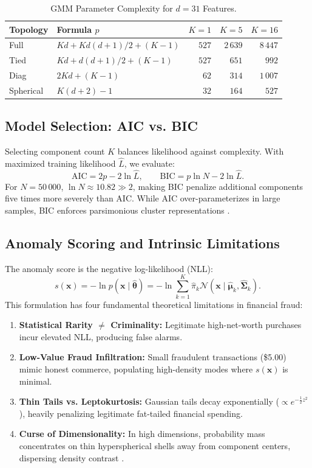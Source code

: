 \begin{table}[h]
\centering
\caption{GMM Parameter Complexity for $d=31$ Features.}
\label{tab:gmm_param_complexity}
\footnotesize
\begin{tabular}{llrrr}
\hline
\textbf{Topology} & \textbf{Formula $p$} & \textbf{$K=1$} & \textbf{$K=5$} & \textbf{$K=16$} \\
\hline
Full & $Kd + Kd(d+1)/2 + (K-1)$ & $527$ & $2\,639$ & $8\,447$ \\
Tied & $Kd + d(d+1)/2 + (K-1)$ & $527$ & $651$ & $992$ \\
Diag & $2Kd + (K-1)$ & $62$ & $314$ & $1\,007$ \\
Spherical & $K(d+2) - 1$ & $32$ & $164$ & $527$ \\
\hline
\end{tabular}
\end{table}

\subsection{Model Selection: AIC vs. BIC}
Selecting component count $K$ balances likelihood against complexity. With maximized training likelihood $\hat{L}$, we evaluate:
\begin{equation}
\text{AIC} = 2p - 2 \ln \hat{L}, \qquad \text{BIC} = p \ln N - 2 \ln \hat{L}.
\label{eq:aic_bic}
\end{equation}
For $N = 50\,000$, $\ln N \approx 10.82 \gg 2$, making BIC penalize additional components five times more severely than AIC. While AIC over-parameterizes in large samples, BIC enforces parsimonious cluster representations \cite{schwarz1978estimating}.

\subsection{Anomaly Scoring and Intrinsic Limitations}
The anomaly score is the negative log-likelihood (NLL):
\begin{equation}
s(\mathbf{x}) = -\ln p(\mathbf{x} \mid \hat{\boldsymbol{\theta}}) = -\ln \sum_{k=1}^K \hat{\pi}_k \mathcal{N}(\mathbf{x} \mid \hat{\boldsymbol{\mu}}_k, \hat{\boldsymbol{\Sigma}}_k).
\label{eq:nll_score}
\end{equation}
This formulation has four fundamental theoretical limitations in financial fraud:
\begin{enumerate}
    \item \textbf{Statistical Rarity $\neq$ Criminality:} Legitimate high-net-worth purchases incur elevated NLL, producing false alarms.
    \item \textbf{Low-Value Fraud Infiltration:} Small fraudulent transactions (\$5.00) mimic honest commerce, populating high-density modes where $s(\mathbf{x})$ is minimal.
    \item \textbf{Thin Tails vs. Leptokurtosis:} Gaussian tails decay exponentially ($\propto e^{-\frac{1}{2}z^2}$), heavily penalizing legitimate fat-tailed financial spending.
    \item \textbf{Curse of Dimensionality:} In high dimensions, probability mass concentrates on thin hyperspherical shells away from component centers, dispersing density contrast \cite{aggarwal2017outlier}.
\end{enumerate}

